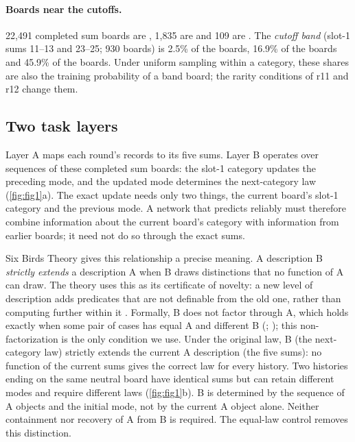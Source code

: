 \paragraph{Boards near the cutoffs.} 22,491 completed sum boards are
\Lcat{}, 1,835 are \Ncat{} and 109 are \Hcat{}. The \emph{cutoff band}
(slot-1 sums 11--13 and 23--25; 930 boards) is 2.5\% of the \Lcat{} boards,
16.9\% of the \Ncat{} boards and 45.9\% of the \Hcat{} boards. Under uniform
sampling within a category, these shares are also the training probability
of a band board; the rarity conditions of r11 and r12 change them.

\subsection{Two task layers}\label{sec:strict}

Layer A maps each round's records to its five sums. Layer B operates over
sequences of these completed sum boards: the slot-1 category updates the
preceding mode, and the updated mode determines the next-category law
(\cref{fig:fig1}a). The exact update needs only two things, the current
board's slot-1 category and the previous mode. A network that predicts
reliably must therefore combine information about the current board's
category with information from earlier boards; it need not do so through the
exact sums.

Six Birds Theory gives this relationship a precise meaning. A description B
\emph{strictly extends} a description A when B draws distinctions that no
function of A can draw. The theory uses this as its certificate of novelty:
a new level of description adds predicates that are not definable from the
old one, rather than computing further within it
\citep[\S1.1]{tsiokos2026foundations}. Formally, B does not factor through A,
which holds exactly when some pair of cases has equal A and different B
(\citealp[Theorem~12]{tsiokos2026foundationsiii};
\citealp[\S3.5]{tsiokos2026strict}); this non-factorization is the only
condition we use. Under the original law, B (the next-category law) strictly
extends the current A description (the five sums): no function of the
current sums gives the correct law for every history. Two histories ending on
the same neutral board have identical sums but can retain different modes
and require different laws (\cref{fig:fig1}b). B is determined by the
sequence of A objects and the initial mode, not by the current A object
alone. Neither containment nor recovery of A from B is required. The
equal-law control removes this distinction.

